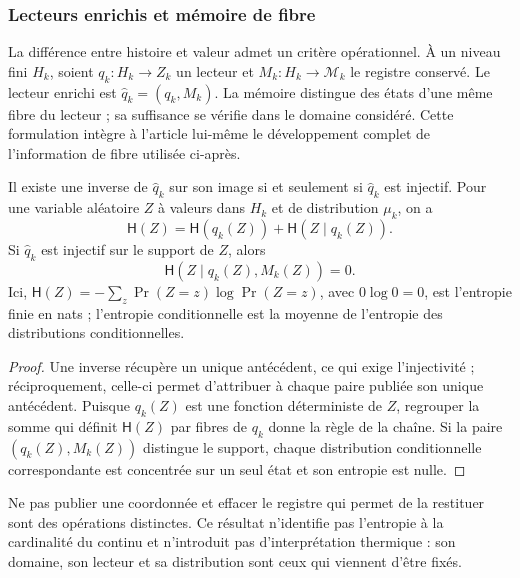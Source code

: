 \subsubsection{Lecteurs enrichis et mémoire de fibre}
\label{ix:sec:ch-memoria-fibra}

La différence entre histoire et valeur admet un critère opérationnel. À un
niveau fini \(H_k\), soient \(q_k:H_k\to Z_k\) un lecteur et
\(M_k:H_k\to\mathcal M_k\) le registre conservé. Le lecteur enrichi
est \(\widehat q_k=(q_k,M_k)\). La mémoire distingue des états d'une même
fibre du lecteur ; sa suffisance se vérifie dans le domaine considéré.
Cette formulation intègre à l'article lui-même le développement complet de
l'information de fibre utilisée ci-après.

\begin{proposition}
\label{ix:prop:ch-recuperabilidad-fibra}
Il existe une inverse de \(\widehat q_k\) sur son image si et seulement si \(\widehat q_k\) est injectif. Pour une variable aléatoire \(Z\) à valeurs dans \(H_k\) et de distribution \(\mu_k\), on a
\[
 \mathsf H(Z)=\mathsf H(q_k(Z))+\mathsf H(Z\mid q_k(Z)).
\]
Si \(\widehat q_k\) est injectif sur le support de \(Z\), alors
\[
 \mathsf H(Z\mid q_k(Z),M_k(Z))=0.
\]
Ici, \(\mathsf H(Z)=-\sum_z\Pr(Z=z)\log\Pr(Z=z)\), avec
\(0\log0=0\), est l'entropie finie en nats ; l'entropie conditionnelle est
la moyenne de l'entropie des distributions conditionnelles.
\end{proposition}

\begin{proof}
Une inverse récupère un unique antécédent, ce qui exige l'injectivité ; réciproquement, celle-ci permet d'attribuer à chaque paire publiée son unique antécédent. Puisque \(q_k(Z)\) est une fonction déterministe de \(Z\), regrouper la somme qui définit \(\mathsf H(Z)\) par fibres de \(q_k\) donne la règle de la chaîne. Si la paire \((q_k(Z),M_k(Z))\) distingue le support, chaque distribution conditionnelle correspondante est concentrée sur un seul état et son entropie est nulle.
\end{proof}

Ne pas publier une coordonnée et effacer le registre qui permet de la restituer sont
des opérations distinctes. Ce résultat n'identifie pas l'entropie à la cardinalité
du continu et n'introduit pas d'interprétation thermique : son domaine, son lecteur et sa
distribution sont ceux qui viennent d'être fixés.

